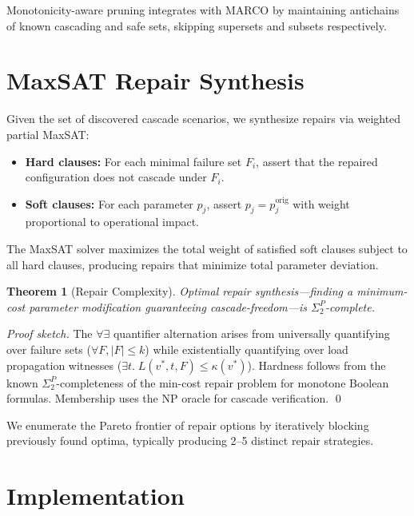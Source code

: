 \documentclass[10pt,twocolumn]{article}
\newtheorem{theorem}{Theorem}
\begin{document}
Monotonicity-aware pruning integrates with MARCO by maintaining antichains
of known cascading and safe sets, skipping supersets and subsets respectively.

\section{MaxSAT Repair Synthesis}
\label{sec:repair}

Given the set of discovered cascade scenarios, we synthesize repairs via
weighted partial MaxSAT:

\begin{itemize}[nosep]
\item \textbf{Hard clauses:} For each minimal failure set $F_i$, assert that
  the repaired configuration does not cascade under $F_i$.
\item \textbf{Soft clauses:} For each parameter $p_j$, assert
  $p_j = p_j^{\mathrm{orig}}$ with weight proportional to operational impact.
\end{itemize}

The MaxSAT solver maximizes the total weight of satisfied soft clauses subject
to all hard clauses, producing repairs that minimize total parameter deviation.

\begin{theorem}[Repair Complexity]
\label{thm:repair}
Optimal repair synthesis---finding a minimum-cost parameter modification
guaranteeing cascade-freedom---is $\Sigma_2^P$-complete.
\end{theorem}

\begin{proof}[Proof sketch]
The $\forall\exists$ quantifier alternation arises from universally
quantifying over failure sets ($\forall F, |F| \le k$) while existentially
quantifying over load propagation witnesses ($\exists t.\; L(v^*,t,F) \le
\kappa(v^*)$). Hardness follows from the known $\Sigma_2^P$-completeness of
the min-cost repair problem for monotone Boolean formulas. Membership uses the
NP oracle for cascade verification. \qed
\end{proof}

We enumerate the Pareto frontier of repair options by iteratively blocking
previously found optima, typically producing 2--5 distinct repair strategies.

\section{Implementation}
\label{sec:impl}
\end{document}
